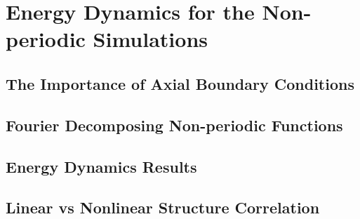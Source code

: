 \chapter{Energy Dynamics for the Non-periodic Simulations}

\section{The Importance of Axial Boundary Conditions}

\section{Fourier Decomposing Non-periodic Functions}

\section{Energy Dynamics Results}

\section{Linear vs Nonlinear Structure Correlation}

